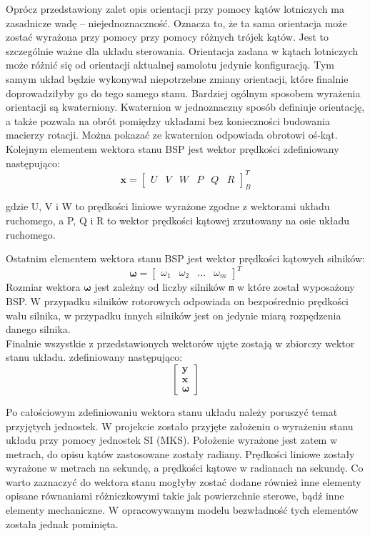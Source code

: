 Oprócz przedstawiony zalet opis orientacji przy pomocy kątów lotniczych ma zasadnicze wadę -- niejednoznaczność. Oznacza to, że ta sama orientacja może zostać wyrażona przy pomocy przy pomocy różnych trójek kątów. Jest to szczególnie ważne dla układu sterowania. Orientacja zadana w kątach lotniczych może różnić się od orientacji aktualnej samolotu jedynie konfiguracją. Tym samym układ będzie wykonywał niepotrzebne zmiany orientacji, które finalnie doprowadziłyby go do tego samego stanu. Bardziej ogólnym sposobem wyrażenia orientacji są kwaterniony. Kwaternion w jednoznaczny sposób definiuje orientację, a także pozwala na obrót pomiędzy układami bez konieczności budowania macierzy rotacji. Można pokazać ze kwaternion odpowiada obrotowi oś-kąt.\\

Kolejnym elementem wektora stanu BSP jest wektor prędkości zdefiniowany następująco:
\[
	\bm{x} = \begin{bmatrix}U & V & W &  P & Q & R  \end{bmatrix}^{T}_{B}
 \]
 
 gdzie U, V i W to prędkości liniowe wyrażone zgodne z wektorami układu ruchomego, a P, Q i R to wektor prędkości kątowej zrzutowany na osie układu ruchomego.
 
 Ostatnim elementem wektora stanu BSP jest wektor prędkości kątowych silników:
 \[
	\bm{\omega} = \begin{bmatrix}\omega_1 & \omega_2 & ... &  \omega_{m}  \end{bmatrix}^{T}
 \]
 Rozmiar wektora $\bm{\omega}$ jest zależny od liczby silników \texttt{m} w które został wyposażony BSP. W przypadku silników rotorowych odpowiada on bezpośrednio prędkości wału silnika, w przypadku innych silników jest on jedynie miarą rozpędzenia danego silnika.\\
 
Finalnie wszystkie z przedstawionych wektorów ujęte zostają w zbiorczy wektor stanu układu. zdefiniowany następująco:
\[
      	\begin{bmatrix} \bm{y}\\ \bm{x} \\  \bm{\omega} \end{bmatrix}
\]

Po całościowym zdefiniowaniu wektora stanu układu należy poruszyć temat przyjętych jednostek. W projekcie zostało przyjęte założeniu o wyrażeniu stanu układu przy pomocy jednostek SI (MKS). Położenie wyrażone jest zatem w metrach, do opisu kątów zastosowane zostały radiany. Prędkości liniowe zostały wyrażone w metrach na sekundę, a prędkości kątowe w radianach na sekundę.
Co warto zaznaczyć do wektora stanu mogłyby zostać dodane również inne elementy opisane równaniami różniczkowymi takie jak powierzchnie sterowe, bądź inne elementy mechaniczne. W opracowywanym modelu bezwładność tych elementów została jednak pominięta.

